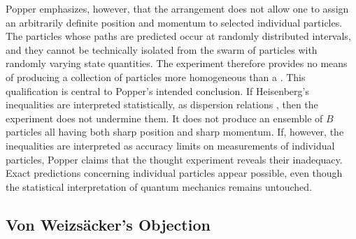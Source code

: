 \documentclass[pdflatex]{sn-jnl}
\newcommand{\vW}{von Weizsäcker\xspace}
\newcommand{\VW}{Von Weizsäcker\xspace}
\providecommand{\DIFdelbegin}{} %
\begin{document}
Popper emphasizes, however, that the arrangement does not allow one to assign an arbitrarily definite position and momentum to selected individual particles. The particles whose paths are predicted occur at randomly distributed intervals, and they cannot be technically isolated from the swarm of particles with randomly varying state quantities. The experiment therefore provides no means of producing a collection of particles more homogeneous than a . This qualification is central to Popper's intended conclusion. If Heisenberg's inequalities are interpreted statistically, as dispersion relations , then the experiment does not undermine them. It does not produce an ensemble of $B$ particles all having both sharp position and sharp momentum. If, however, the inequalities are interpreted as accuracy limits  on measurements of individual particles, Popper claims that the thought experiment reveals their inadequacy. Exact predictions concerning individual particles appear possible, even though the statistical interpretation of quantum mechanics remains untouched.

\subsection{\VW's Objection}

\DIFdelbegin %

\end{document}
